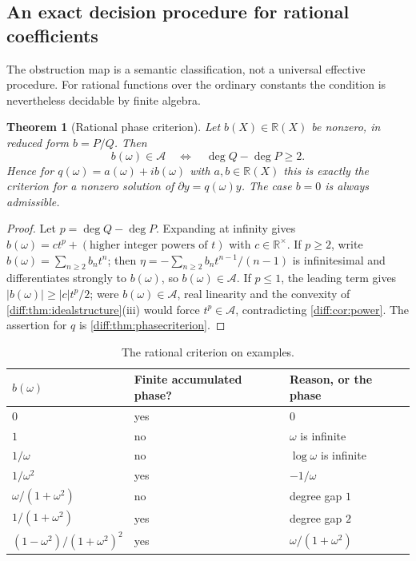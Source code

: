 \documentclass[11pt,letterpaper]{article}
\numberwithin{equation}{section}
\newtheorem{theorem}{Theorem}[section]
\theoremstyle{definition}
\theoremstyle{remark}
\newcommand{\R}{\mathbb R}
\newcommand{\der}{\partial}
\newcommand{\Acl}{\mathcal A}
\newcommand{\abs}[1]{\lvert#1\rvert}
\begin{document}
\subsection{An exact decision procedure for rational coefficients}
\label{diff:sub:rationalcriterion}

The obstruction map is a semantic classification, not a universal effective
procedure. For rational functions over the ordinary constants the condition is
nevertheless decidable by finite algebra.

\begin{theorem}[Rational phase criterion]
\label{diff:thm:rational}
Let $b(X)\in\R(X)$ be nonzero, in reduced form $b=P/Q$. Then
\begin{equation}\label{diff:eq:rationalcriterion}
 b(\omega)\in\Acl
 \quad\Longleftrightarrow\quad
 \deg Q-\deg P\geq2 .
\end{equation}
Hence for $q(\omega)=a(\omega)+ib(\omega)$ with $a,b\in\R(X)$ this is exactly
the criterion for a nonzero solution of $\der y=q(\omega)y$. The case $b=0$ is
always admissible.
\end{theorem}
\begin{proof}
Let $p=\deg Q-\deg P$. Expanding at infinity gives
$b(\omega)=ct^{p}+(\text{higher integer powers of }t)$ with $c\in\R^{\times}$.
If $p\geq2$, write $b(\omega)=\sum_{n\geq2}b_{n}t^{n}$; then
$\eta=-\sum_{n\geq2}b_{n}t^{n-1}/(n-1)$ is infinitesimal and differentiates
strongly to $b(\omega)$, so $b(\omega)\in\Acl$. If $p\leq1$, the leading term
gives $\abs{b(\omega)}\geq\abs c t^{p}/2$; were $b(\omega)\in\Acl$, real
linearity and the convexity of \cref{diff:thm:idealstructure}(iii) would force
$t^{p}\in\Acl$, contradicting \cref{diff:cor:power}. The assertion for $q$ is
\cref{diff:thm:phasecriterion}.
\end{proof}

\begin{table}[htbp]
\centering\small
\caption{The rational criterion on examples.}
\label{diff:tab:rational}
\begin{tabular}{@{}lll@{}}
\toprule
$b(\omega)$ & Finite accumulated phase? & Reason, or the phase \\
\midrule
$0$ & yes & $0$ \\
$1$ & no & $\omega$ is infinite \\
$1/\omega$ & no & $\log\omega$ is infinite \\
$1/\omega^{2}$ & yes & $-1/\omega$ \\
$\omega/(1+\omega^{2})$ & no & degree gap $1$ \\
$1/(1+\omega^{2})$ & yes & degree gap $2$ \\
$(1-\omega^{2})/(1+\omega^{2})^{2}$ & yes & $\omega/(1+\omega^{2})$ \\
\bottomrule
\end{tabular}
\end{table}
\end{document}
